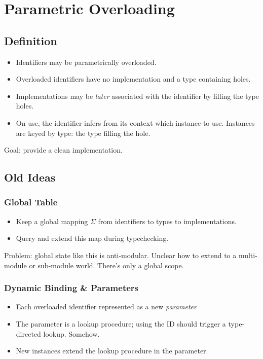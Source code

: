 \documentclass{article}
\begin{document}
\section*{Parametric Overloading}

\subsection*{Definition}
\begin{itemize}
\item Identifiers may be parametrically overloaded.
\item Overloaded identifiers have no implementation and a type containing holes.
\item Implementations may be \emph{later} associated with the identifier by filling the type holes.
\item On use, the identifier infers from its context which instance to use.
  Instances are keyed by type: the type filling the hole.
\end{itemize}

Goal: provide a clean implementation.

\subsection*{Old Ideas}
\subsubsection*{Global Table}
\begin{itemize}
\item Keep a global mapping $\Sigma$ from identifiers to types to implementations.
\item Query and extend this map during typechecking.
\end{itemize}

Problem: global state like this is anti-modular.
Unclear how to extend to a multi-module or sub-module world.
There's only a global scope.

\subsubsection*{Dynamic Binding \& Parameters}
\begin{itemize}
\item Each overloaded identifier represented as a new \emph{parameter}
\item The parameter is a lookup procedure; using the ID should trigger a type-directed lookup.
  Somehow.
\item New instances extend the lookup procedure in the parameter.
\end{itemize}
\end{document}
